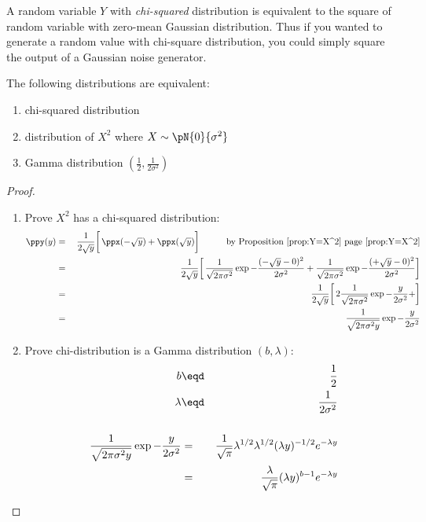 A random variable $Y$ with {\em chi-squared} distribution is equivalent 
to the square of random variable with zero-mean Gaussian distribution.
Thus if you wanted to generate a random value with chi-square distribution,
you could simply square the output of a Gaussian noise generator.
\begin{theorem}
\label{thm:Gamma=X^2}
The following distributions are equivalent:
\begin{enumerate}
  \item chi-squared distribution
  \item distribution of $X^2$ where $X\sim\pN{0}{\sigma^2}$
  \item Gamma distribution $\left(\frac{1}{2},\frac{1}{2\sigma^2} \right)$
\end{enumerate}
\end{theorem}
\begin{proof}
\begin{enumerate}

\item Prove $X^2$ has a chi-squared distribution:
\begin{eqnarray*}
  \ppy(y)
    &=& \left.\left.\frac{1}{2\sqrt{y}}\right[
        \ppx(-\sqrt{y}) + \ppx( \sqrt{y}) \right]
        \hspace{1cm}\mbox{by Proposition~\ref{prop:Y=X^2} page~\pageref{prop:Y=X^2}}
  \\&=& \left.\left.\frac{1}{2\sqrt{y}}\right[
        \frac{1}{\sqrt{2\pi\sigma^2}} \exp{-\frac{(-\sqrt{y}-0)^2}{2\sigma^2}}+
        \frac{1}{\sqrt{2\pi\sigma^2}} \exp{-\frac{(+\sqrt{y}-0)^2}{2\sigma^2}}
        \right]
  \\&=& \left.\left.\frac{1}{2\sqrt{y}}\right[
        2\frac{1}{\sqrt{2\pi\sigma^2}} \exp{-\frac{y}{2\sigma^2}}+
        \right]
  \\&=& \frac{1}{\sqrt{2\pi \sigma^2 y}} \exp{-\frac{y}{2\sigma^2}}
\end{eqnarray*}

\item Prove chi-distribution is a Gamma distribution $(b,\lambda)$:
\begin{eqnarray*}
  b &\eqd& \frac{1}{2} \\
  \lambda &\eqd& \frac{1}{2\sigma^2} \\
\\
  \frac{1}{\sqrt{2\pi\sigma^2y}}\exp{-\frac{y}{2\sigma^2}}
    &=& \frac{1}{\sqrt{\pi}}\lambda^{1/2} \lambda^{1/2} (\lambda y)^{-1/2} e^{-\lambda y}
  \\&=& \frac{\lambda}{\sqrt{\pi}} (\lambda y)^{b-1} e^{-\lambda y}
\end{eqnarray*}

\end{enumerate}
\end{proof}

